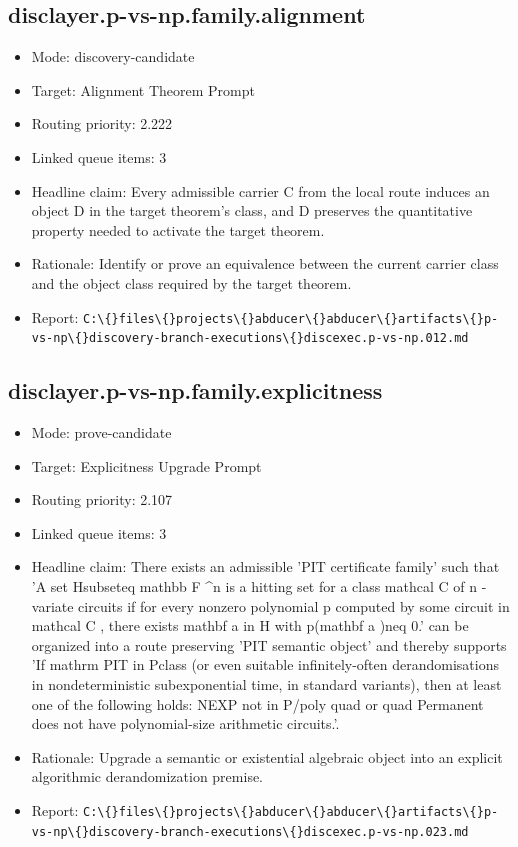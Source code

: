 \documentclass[11pt]{article}
\begin{document}
\subsection*{disclayer.p-vs-np.family.alignment}
\begin{itemize}
\item Mode: discovery-candidate
\item Target: Alignment Theorem Prompt
\item Routing priority: 2.222
\item Linked queue items: 3
\item Headline claim: Every admissible carrier C from the local route induces an object D in the target theorem's class, and D preserves the quantitative property needed to activate the target theorem.
\item Rationale: Identify or prove an equivalence between the current carrier class and the object class required by the target theorem.
\item Report: \texttt{C:\textbackslash\{\}files\textbackslash\{\}projects\textbackslash\{\}abducer\textbackslash\{\}abducer\textbackslash\{\}artifacts\textbackslash\{\}p-vs-np\textbackslash\{\}discovery-branch-executions\textbackslash\{\}discexec.p-vs-np.012.md}
\end{itemize}

\subsection*{disclayer.p-vs-np.family.explicitness}
\begin{itemize}
\item Mode: prove-candidate
\item Target: Explicitness Upgrade Prompt
\item Routing priority: 2.107
\item Linked queue items: 3
\item Headline claim: There exists an admissible 'PIT certificate family' such that 'A set Hsubseteq mathbb F \textasciicircum{}n is a hitting set for a class mathcal C of n -variate circuits if for every nonzero polynomial p computed by some circuit in mathcal C , there exists mathbf a in H with p(mathbf a )neq 0.' can be organized into a route preserving 'PIT semantic object' and thereby supports 'If mathrm PIT in Pclass (or even suitable infinitely-often derandomisations in nondeterministic subexponential time, in standard variants), then at least one of the following holds: NEXP not in P/poly quad or quad Permanent does not have polynomial-size arithmetic circuits.'.
\item Rationale: Upgrade a semantic or existential algebraic object into an explicit algorithmic derandomization premise.
\item Report: \texttt{C:\textbackslash\{\}files\textbackslash\{\}projects\textbackslash\{\}abducer\textbackslash\{\}abducer\textbackslash\{\}artifacts\textbackslash\{\}p-vs-np\textbackslash\{\}discovery-branch-executions\textbackslash\{\}discexec.p-vs-np.023.md}
\end{itemize}
\end{document}
